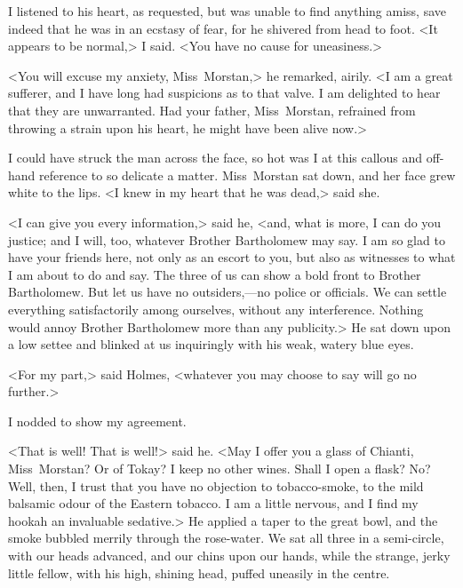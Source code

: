 I listened to his heart, as requested, but was unable to find anything amiss, save indeed that he was in an ecstasy of fear, for he shivered from head to foot. <It appears to be normal,> I said. <You have no cause for uneasiness.>

<You will excuse my anxiety, Miss~Morstan,> he remarked, airily. <I am a great sufferer, and I have long had suspicions as to that valve. I am delighted to hear that they are unwarranted. Had your father, Miss~Morstan, refrained from throwing a strain upon his heart, he might have been alive now.>

I could have struck the man across the face, so hot was I at this callous and off-hand reference to so delicate a matter. Miss~Morstan sat down, and her face grew white to the lips. <I knew in my heart that he was dead,> said she.

<I can give you every information,> said he, <and, what is more, I can do you justice; and I will, too, whatever Brother Bartholomew may say. I am so glad to have your friends here, not only as an escort to you, but also as witnesses to what I am about to do and say. The three of us can show a bold front to Brother Bartholomew. But let us have no outsiders,—no police or officials. We can settle everything satisfactorily among ourselves, without any interference. Nothing would annoy Brother Bartholomew more than any publicity.> He sat down upon a low settee and blinked at us inquiringly with his weak, watery blue eyes.

<For my part,> said Holmes, <whatever you may choose to say will go no further.>

I nodded to show my agreement.

<That is well! That is well!> said he. <May I offer you a glass of Chianti, Miss~Morstan? Or of Tokay? I keep no other wines. Shall I open a flask? No? Well, then, I trust that you have no objection to tobacco-smoke, to the mild balsamic odour of the Eastern tobacco. I am a little nervous, and I find my hookah an invaluable sedative.> He applied a taper to the great bowl, and the smoke bubbled merrily through the rose-water. We sat all three in a semi-circle, with our heads advanced, and our chins upon our hands, while the strange, jerky little fellow, with his high, shining head, puffed uneasily in the centre.

